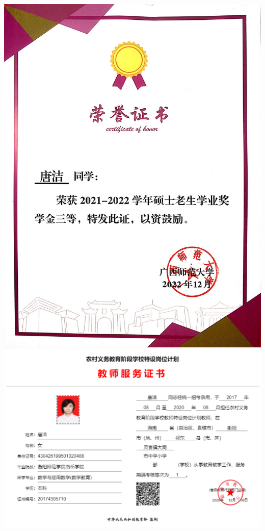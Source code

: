 \documentclass[UFT8]{ctexart}%
\begin{document}
\begin{center}
 \includegraphics[scale=0.15]{figs/2022-12.png }
 \includegraphics[scale=0.2]{figs/特岗服务证书.png }

\end{center}
\end{document}
